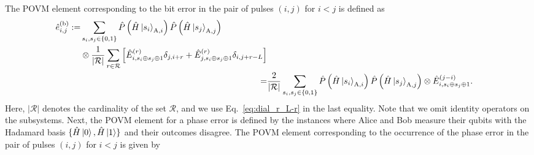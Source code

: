 \documentclass[twocolumn,superscriptaddress,pra,footinbib,notitlepage]{revtex4-1}
\newcommand{\1}{\mbox{1}\hspace{-0.25em}\mbox{l}}
\newcommand{\abs}[1]{\lvert#1\rvert}
\begin{document}
The POVM element corresponding to the bit error in the pair of pulses $(i, j)$ for $i<j$ is defined as
\begin{align}
\begin{split}
\hat{e}^{(\textrm{b})}_{i, j}:=&\sum_{s_i, s_j\in\{0, 1\}}\hat{P}\left(\hat{H}\ket{s_i}_{\textrm{A}, i}\right)\hat{P}\left(\hat{H}\ket{s_j}_{\textrm{A}, j}\right)\\
&\otimes\frac{1}{\abs{\mathcal{R}}}\sum_{r\in\mathcal{R}}\left[\hat{E}_{i, s_i\oplus s_j\oplus1}^{(r)}\delta_{j, i+r}+\hat{E}_{j, s_i\oplus s_j\oplus1}^{(r)}\delta_{i, j+r-L}\right]
\end{split}\nonumber\\
=&\frac{2}{\abs{\mathcal{R}}}\sum_{s_i, s_j\in\{0, 1\}}\hat{P}\left(\hat{H}\ket{s_i}_{\textrm{A}, i}\right)\hat{P}\left(\hat{H}\ket{s_j}_{\textrm{A}, j}\right)\otimes\hat{E}_{i, s_i\oplus s_j\oplus1}^{(j-i)}.
\label{defi:ebitPOVM_ij}
\end{align}
Here, $\abs{\mathcal{R}}$ denotes the cardinality of the set $\mathcal{R}$, and we use Eq.~\eqref{eq:dial_r_L-r} in the last equality.
Note that we omit identity operators on the subsystems.
Next, the POVM element for a phase error is defined by the instances where Alice and Bob measure their qubits with the Hadamard basis $\{\hat{H}\ket{0}, \hat{H}\ket{1}\}$ and their outcomes disagree.
The POVM element corresponding to the occurrence of the phase error in the pair of pulses $(i, j)$ for $i<j$ is given by
\end{document}

